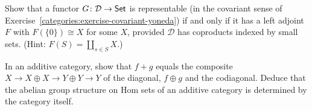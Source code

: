 \begin{exercise}\label{categories:exercise-left-adjoint-sets}
Show that a functor $G \colon \mathcal{D} \to \mathsf{Set}$ is representable (in the covariant
sense of Exercise~\ref{categories:exercise-covariant-yoneda}) if and only if it has
a left adjoint $F$ with $F(\{0\}) \cong X$ for some $X$, provided $\mathcal{D}$ has
coproducts indexed by small sets. (Hint: $F(S) = \coprod_{s \in S} X$.)
\end{exercise}

\begin{exercise}\label{categories:exercise-zero-morphisms}
In an additive category, show that $f + g$ equals the composite
$X \to X \oplus X \to Y \oplus Y \to Y$ of the diagonal, $f \oplus g$ and the
codiagonal. Deduce that the abelian group structure on Hom sets of an additive
category is determined by the category itself.
\end{exercise}

